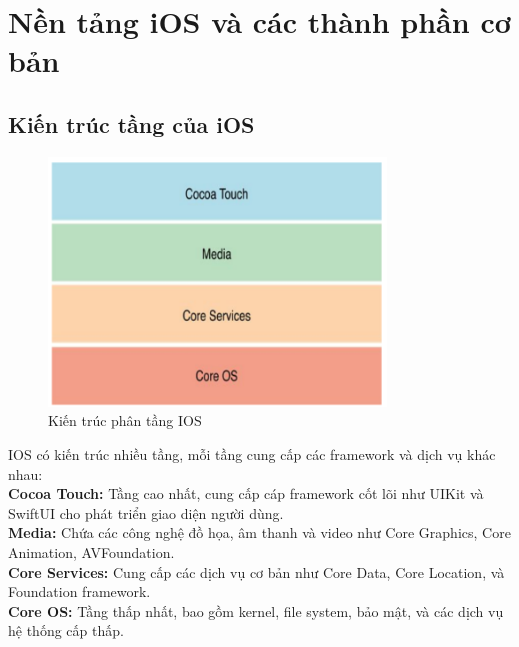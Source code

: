 
\section{Nền tảng iOS và các thành phần cơ bản}
    \subsection{Kiến trúc tầng của iOS}
        \begin{flushleft}
            \begin{figure}[H] %
                \centering
                \includegraphics[width=0.8\textwidth]{images/kientrucios.png}
                \caption{Kiến trúc phân tầng IOS}
                \label{fig:kientrucios}
            \end{figure}

        IOS có kiến trúc nhiều tầng, mỗi tầng cung cấp các framework và dịch vụ khác nhau:\\
            \textbf{Cocoa Touch:} Tầng cao nhất, cung cấp cáp framework cốt lõi như UIKit và SwiftUI cho phát triển giao diện người dùng.\\
            \textbf{Media:} Chứa các công nghệ đồ họa, âm thanh và video như Core Graphics, Core Animation, AVFoundation.\\
            \textbf{Core Services:} Cung cấp các dịch vụ cơ bản như Core Data, Core Location, và Foundation framework.\\
            \textbf{Core OS:} Tầng thấp nhất, bao gồm kernel, file system, bảo mật, và các dịch vụ hệ thống cấp thấp.\\
       
        \end{flushleft}
